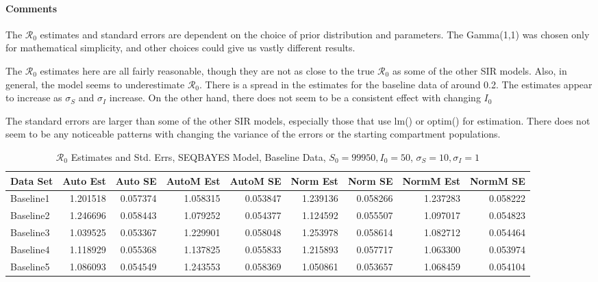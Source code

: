 \documentclass[12pt]{article}
\newcommand{\rr}{\ensuremath{\mathcal{R}_0}}
\begin{document}
\paragraph{Comments}

The $\rr$ estimates and standard errors are dependent on the choice of prior distribution and parameters. The Gamma(1,1) was chosen only for mathematical simplicity, and other choices could give us vastly different results. 

The $\rr$ estimates here are all fairly reasonable, though they are not as close to the true $\rr$ as some of the other SIR models. Also, in general, the model seems to underestimate $\rr$. There is a spread in the estimates for the baseline data of around 0.2. The estimates appear to increase as $\sigma_S$ and $\sigma_I$ increase. On the other hand, there does not seem to be a consistent effect with changing $I_0$

The standard errors are larger than some of the other SIR models, especially those that use lm() or optim() for estimation. There does not seem to be any noticeable patterns with changing the variance of the errors or the starting compartment populations.

\begin{table}[H]
	
	\caption{$\rr$ Estimates and Std. Errs, SEQBAYES Model, 
		Baseline Data, $S_0 = 99950, I_0 = 50$, 
		$\sigma_S = 10, \sigma_I = 1$}
	\begin{footnotesize}
		\hskip -1cm
	\begin{tabular}{l|r|r|r|r|r|r|r|r}
		\hline
		Data Set & Auto Est & Auto SE & AutoM Est & AutoM SE & Norm Est & Norm SE & NormM Est & NormM SE\\
		\hline
		Baseline1 & 1.201518 & 0.057374 & 1.058315 & 0.053847 & 1.239136 & 0.058266 & 1.237283 & 0.058222\\
		\hline
		Baseline2 & 1.246696 & 0.058443 & 1.079252 & 0.054377 & 1.124592 & 0.055507 & 1.097017 & 0.054823\\
		\hline
		Baseline3 & 1.039525 & 0.053367 & 1.229901 & 0.058048 & 1.253978 & 0.058614 & 1.082712 & 0.054464\\
		\hline
		Baseline4 & 1.118929 & 0.055368 & 1.137825 & 0.055833 & 1.215893 & 0.057717 & 1.063300 & 0.053974\\
		\hline
		Baseline5 & 1.086093 & 0.054549 & 1.243553 & 0.058369 & 1.050861 & 0.053657 & 1.068459 & 0.054104\\
		\hline
	\end{tabular}
\end{footnotesize}
\end{table}
\end{document}
